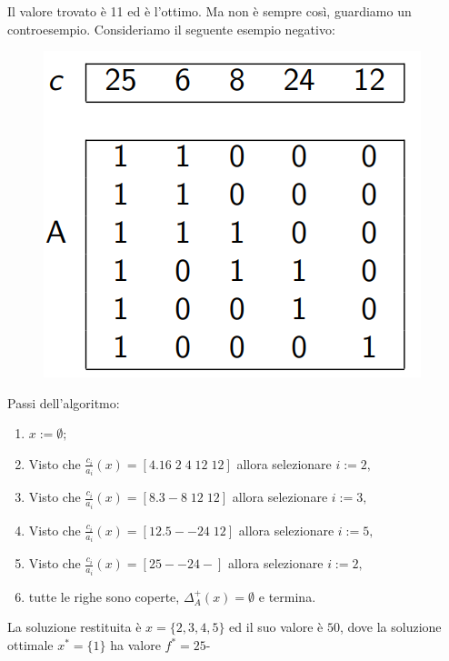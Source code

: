 \documentclass{article}
\begin{document}
Il valore trovato è 11 ed è l'ottimo. Ma non è sempre così, guardiamo un controesempio.
Consideriamo il seguente esempio negativo:
\begin{figure}[H]
    \centering
    \includegraphics[scale=0.5]{images/set_cover_neg.png}
\end{figure}
Passi dell'algoritmo:
\begin{enumerate}
    \item $x:=\emptyset;$
    \item Visto che $\frac{c_i}{a_i}(x)=[4.16\; 2\;4\; 12\; 12]$ allora selezionare $i:=2,$
    \item Visto che $\frac{c_i}{a_i}(x)=[8.3 - 8\;12\;12]$ allora selezionare $i:=3,$
    \item Visto che $\frac{c_i}{a_i}(x)=[12.5 - - 24\;12]$ allora selezionare $i:=5,$
    \item Visto che $\frac{c_i}{a_i}(x)=[25 - - 24 -]$ allora selezionare $i:=2,$
    \item tutte le righe sono coperte, $\Delta_A^+(x)=\emptyset$ e termina.
\end{enumerate}

La soluzione restituita è $x=\{2,3,4,5\}$ ed il suo valore è $50$, dove la soluzione
ottimale $x^*=\{1\}$ ha valore $f^*=25$-
\end{document}
